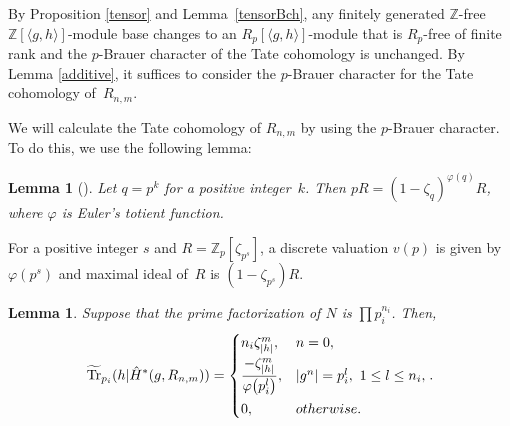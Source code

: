 \documentclass[11pt]{article}
\numberwithin{equation}{section}
\numberwithin{equation}{section}
\newtheorem{Lemma}[Theorem]{Lemma}
\begin{document}
By Proposition \ref{tensor} and Lemma~\ref{tensorBch}, any finitely generated $\mathbb{Z}$-free $\mathbb{Z}[\langle g,h \rangle]$-module base changes to an $R_p[\langle g,h \rangle]$-module that is $R_p$-free of finite rank and the $p$-Brauer character of the Tate cohomology is unchanged.
By Lemma \ref{additive}, it suffices to consider the $p$-Brauer character for the Tate cohomology of~$R_{n,m}$.

We will calculate the Tate cohomology of $R_{n,m}$ by using the $p$-Brauer character. To do this, we use the following lemma:

\begin{Lemma}[{\cite[Chapter III, Lemma 3]{CF}}] \label{pR}
 Let $q=p^k$ for a positive integer~$k$. Then $pR=(1-\zeta_q)^{\varphi(q)}R$, where $\varphi$ is Euler's totient function.
\end{Lemma}

For a positive integer $s$ and $R=\mathbb{Z}_{p}[\zeta_{p^s}]$, a discrete valuation $v(p)$ is given by $\varphi(p^s)$ and maximal ideal of~$R$ is $(1-\zeta_{p^s})R$.

\begin{Lemma}\label{Bch}
Suppose that the prime factorization of $N$ is $\prod p_i^{n_i}$.
Then,
\[
\widetilde{\operatorname{Tr}}_{p_i}(h|\hat{H}^*(g,R_{n,m}))= \begin{cases}
n_i\zeta_{|h|}^m, & n=0, \vspace{1mm}\\
\dfrac{-\zeta_{|h|}^m}{\varphi \big(p_i^l\big)}, & |g^n|=p_i^l, \ 1\leq l\leq n_i, \vspace{1mm}\\
0, & otherwise.
\end{cases}.
\]
\end{Lemma}
\end{document}

